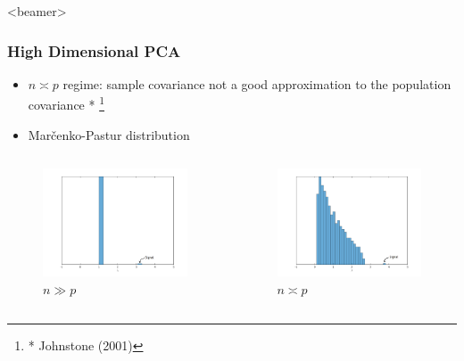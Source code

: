 \documentclass{beamer}
\newcommand\blfootnote[1]{%
  \begingroup
  \renewcommand\thefootnote{}\footnote{#1}%
  \addtocounter{footnote}{-1}%
  \endgroup
}
\begin{document}
\begin{frame}<beamer>
\frametitle{High Dimensional PCA}
\begin{itemize}[]
\item $n \asymp p$ regime: sample covariance not a good approximation to the population covariance * \blfootnote{* Johnstone (2001)}
\item Mar\v{c}enko-Pastur distribution
\end{itemize}
\begin{columns}
\begin{figure}
\centering
\includegraphics[width=1\linewidth]{figures/mpplot_clt.png}
\caption{$n \gg p$}
\end{figure}
\begin{figure}
\includegraphics[width=1\linewidth]{figures/mpplot_high.png}
\caption{$n \asymp p$}
\label{fig:shrinkage}
\end{figure}
\end{columns}
\end{frame}
\end{document}
